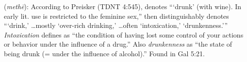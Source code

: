 \item[Drunkenness,]

(\textit{methē}):
According to Preisker (TDNT 4:545),  denotes ```drunk' (with wine). In early lit. use is restricted to the feminine sex,'' then  distinguishably denotes ```drink,' \ldots mostly `over-rich drinking,' \ldots often `intoxication,' `drunkenness.''' \emph{Intoxication} defines as ``the condition of having lost some control of your actions or behavior under the influence of a drug.'' Also \emph{drunkenness}  as ``the state of being drunk (= under the influence of alcohol).''
Found in Gal 5:21.
